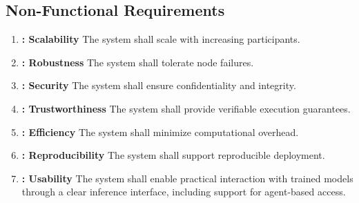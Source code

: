 
\subsection{Non-Functional Requirements}

\begin{enumerate}
    \item \label{req:NF1} \textbf{\thenonFuncReq: Scalability}  
    The system shall scale with increasing participants.

    \item \label{req:NF2} \textbf{\thenonFuncReq: Robustness}  
    The system shall tolerate node failures.

    \item \label{req:NF3} \textbf{\thenonFuncReq: Security}  
    The system shall ensure confidentiality and integrity.

    \item \label{req:NF4} \textbf{\thenonFuncReq: Trustworthiness}  
    The system shall provide verifiable execution guarantees.

    \item \label{req:NF5} \textbf{\thenonFuncReq: Efficiency}  
    The system shall minimize computational overhead.


    \item \label{req:NF9} \textbf{\thenonFuncReq: Reproducibility}  
    The system shall support reproducible deployment.

    \item \label{req:NF10} \textbf{\thenonFuncReq: Usability}  
    The system shall enable practical interaction with trained models through a clear inference interface, including support for agent-based access.

\end{enumerate}

